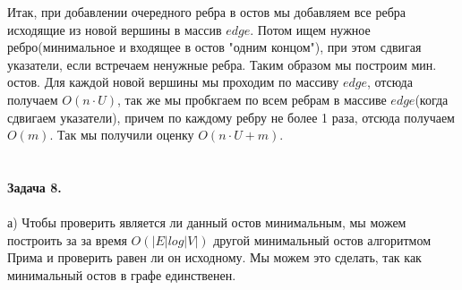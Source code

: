 \documentclass[12pt,a4paper]{scrartcl}
\begin{document}
	Итак, при добавлении очередного ребра в остов мы добавляем все ребра исходящие из новой вершины в массив $edge$. Потом ищем нужное ребро(минимальное и входящее в остов "одним концом"), при этом сдвигая указатели, если встречаем ненужные ребра. Таким образом мы построим мин. остов. Для каждой новой вершины мы проходим по массиву $edge$, отсюда получаем $O(n \cdot U)$, так же мы пробкгаем по всем ребрам в массиве $edge$(когда сдвигаем указатели), причем по каждому ребру не более 1 раза, отсюда получаем $O(m)$. Так мы получили оценку $O(n \cdot U + m)$. \\
	\\
	\\
	\textbf{Задача 8.} \\
	\\
	а) Чтобы проверить является ли данный остов минимальным, мы можем построить за за время $O(|E|log|V|)$ другой минимальный остов алгоритмом Прима и проверить равен ли он исходному. Мы можем это сделать, так как минимальный остов в графе единственен.
\end{document}
